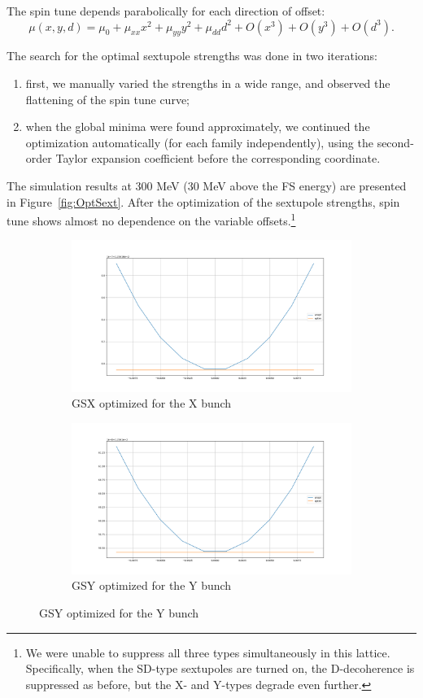 \documentclass{article}
\begin{document}
The spin tune depends parabolically for each direction of offset:
\[
\mu(x,y,d) = \mu_0 + \mu_{xx}x^2 + \mu_{yy}y^2 + \mu_{dd}d^2 + O(x^3) + O(y^3) + O(d^3).
\]

The search for the optimal sextupole strengths was done in two iterations:
\begin{enumerate}
\item first, we manually varied the strengths in a wide range, and observed the flattening of the spin tune curve;
\item when the global minima were found approximately, we continued the optimization automatically (for each family independently), using the second-order Taylor expansion coefficient before the corresponding coordinate.
\end{enumerate}

The simulation results at 300 MeV (30 MeV above the FS energy) are presented in Figure~\ref{fig:OptSext}. After the optimization of the sextupole strengths, spin tune shows almost no dependence on the variable offsets.\footnote{We were unable to suppress all three types simultaneously in this lattice. Specifically, when the SD-type sextupoles are turned on, the D-decoherence is suppressed as before, but the X- and Y-types degrade even further.}
\begin{figure}
  \centering
  \begin{subfigure}[b]{\textwidth}\centering
    \includegraphics[width=\textwidth]{img/SPINTUNE_X_GSX_optim}
    \caption{GSX optimized for the X bunch}
  \end{subfigure}
  \begin{subfigure}[b]{\textwidth}\centering
    \includegraphics[width=\textwidth]{img/SPINTUNE_Y_GSY_optim}
    \caption{GSY optimized for the Y bunch}
  \end{subfigure}
\end{figure}
\end{document}
